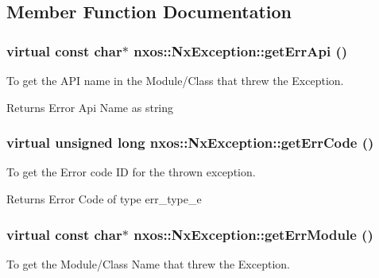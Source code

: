 \subsection{Member Function Documentation}
\hypertarget{classnxos_1_1NxException_a82ce0a75c61b55ca191c86e5abfeaa20}{
\subsubsection[{getErrApi}]{\setlength{\rightskip}{0pt plus 5cm}virtual const char$\ast$ nxos::NxException::getErrApi ()}}
\label{classnxos_1_1NxException_a82ce0a75c61b55ca191c86e5abfeaa20}
To get the API name in the Module/Class that threw the Exception.

\begin{DoxyReturn}{Returns}
Error Api Name as string 
\end{DoxyReturn}
\hypertarget{classnxos_1_1NxException_ace42c480c5b1efc0779028339a09f067}{
\subsubsection[{getErrCode}]{\setlength{\rightskip}{0pt plus 5cm}virtual unsigned long nxos::NxException::getErrCode ()}}
\label{classnxos_1_1NxException_ace42c480c5b1efc0779028339a09f067}
To get the Error code ID for the thrown exception.

\begin{DoxyReturn}{Returns}
Error Code of type err\_\-type\_\-e 
\end{DoxyReturn}
\hypertarget{classnxos_1_1NxException_ad428a765217581f320af95386350ef30}{
\subsubsection[{getErrModule}]{\setlength{\rightskip}{0pt plus 5cm}virtual const char$\ast$ nxos::NxException::getErrModule ()}}
\label{classnxos_1_1NxException_ad428a765217581f320af95386350ef30}
To get the Module/Class Name that threw the Exception.

